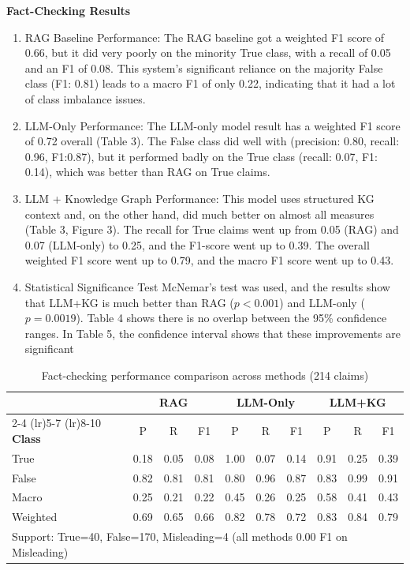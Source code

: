 \documentclass[11pt]{article}
\begin{document}
\textbf{Fact-Checking Results} 

\begin{enumerate}
    

\item{RAG Baseline Performance}: The RAG baseline got a weighted F1 score of 0.66, but it did very poorly on the minority True class, with a recall of 0.05 and an F1 of 0.08. This system's significant reliance on the majority False class (F1: 0.81) leads to a macro F1 of only 0.22,  indicating that it had a lot of class imbalance issues.



\item{LLM-Only Performance}: The LLM-only model result has a weighted F1 score of 0.72 overall (Table 3). The False class did well with (precision: 0.80, recall: 0.96, F1:0.87), but it performed badly on the True class (recall: 0.07, F1: 0.14), which was better than RAG on True claims.

 
\item {LLM + Knowledge Graph Performance}: This model uses structured KG context and, on the other hand, did much better on almost all measures (Table 3, Figure 3). The recall for True claims went up from 0.05 (RAG) and 0.07 (LLM-only) to 0.25, and the F1-score went up to 0.39. The overall weighted F1 score went up to 0.79, and the macro F1 score went up to 0.43.

\item {Statistical Significance Test}
McNemar's test was used, and the results show that LLM+KG is much better than RAG ($p<0.001$) and LLM-only ($p=0.0019$). Table 4 shows there is no overlap between the 95\% confidence ranges. In Table 5, the confidence interval shows that these improvements are significant

\end{enumerate}

\begin{table}[htbp]
\centering
\begin{tabular}{lccccccccc}
\toprule
& \multicolumn{3}{c}{\textbf{RAG}} & \multicolumn{3}{c}{\textbf{LLM-Only}} & \multicolumn{3}{c}{\textbf{LLM+KG}} \\
\cmidrule(lr){2-4} \cmidrule(lr){5-7} \cmidrule(lr){8-10}
\textbf{Class} & P & R & F1 & P & R & F1 & P & R & F1 \\
\midrule
True   & 0.18 & 0.05 & 0.08 & 1.00 & 0.07 & 0.14 & 0.91 & 0.25 & 0.39 \\
False  & 0.82 & 0.81 & 0.81 & 0.80 & 0.96 & 0.87 & 0.83 & 0.99 & 0.91 \\
\midrule
Macro     & 0.25 & 0.21 & 0.22 & 0.45 & 0.26 & 0.25 & 0.58 & 0.41 & 0.43 \\
Weighted  & 0.69 & 0.65 & 0.66 & 0.82 & 0.78 & 0.72 & 0.83 & 0.84 & 0.79 \\
\bottomrule
\multicolumn{10}{l}{\footnotesize Support: True=40, False=170, Misleading=4 (all methods 0.00 F1 on Misleading)} \\
\end{tabular}
\caption{Fact-checking performance comparison across methods (214 claims)}
\label{tab:factcheck_comparison}
\end{table}
\end{document}
